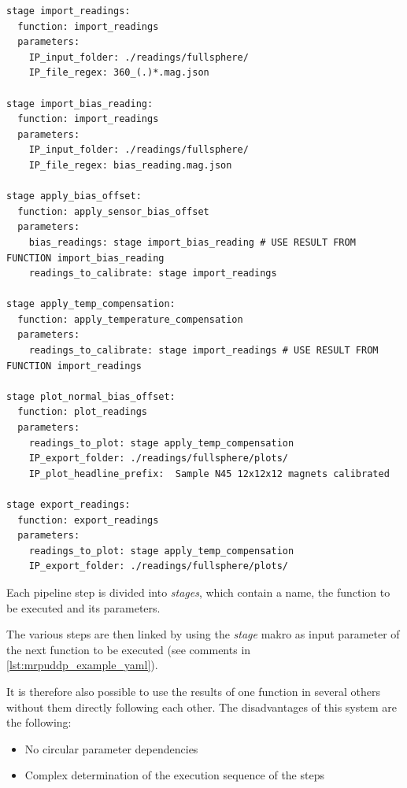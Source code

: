 \begin{lstlisting}[caption={Example YAML code of an user defined processing pipeline with six stages linked together}, label=lst:mrpuddp_example_yaml]
stage import_readings:
  function: import_readings
  parameters:
    IP_input_folder: ./readings/fullsphere/
    IP_file_regex: 360_(.)*.mag.json

stage import_bias_reading:
  function: import_readings
  parameters:
    IP_input_folder: ./readings/fullsphere/
    IP_file_regex: bias_reading.mag.json

stage apply_bias_offset:
  function: apply_sensor_bias_offset
  parameters:
    bias_readings: stage import_bias_reading # USE RESULT FROM FUNCTION import_bias_reading
    readings_to_calibrate: stage import_readings

stage apply_temp_compensation:
  function: apply_temperature_compensation
  parameters:
    readings_to_calibrate: stage import_readings # USE RESULT FROM FUNCTION import_readings

stage plot_normal_bias_offset:
  function: plot_readings
  parameters:
    readings_to_plot: stage apply_temp_compensation
    IP_export_folder: ./readings/fullsphere/plots/
    IP_plot_headline_prefix:  Sample N45 12x12x12 magnets calibrated

stage export_readings:
  function: export_readings
  parameters:
    readings_to_plot: stage apply_temp_compensation
    IP_export_folder: ./readings/fullsphere/plots/
\end{lstlisting}

Each pipeline step is divided into \emph{stages}, which contain a name,
the function to be executed and its parameters.

\newpage

The various steps are then linked by using the \emph{stage } makro as
input parameter of the next function to be executed (see comments in
\ref{lst:mrpuddp_example_yaml}).

It is therefore also possible to use the results of one function in
several others without them directly following each other. The
disadvantages of this system are the following:

\begin{itemize}
\tightlist
\item
  No circular parameter dependencies
\item
  Complex determination of the execution sequence of the steps
\end{itemize}

